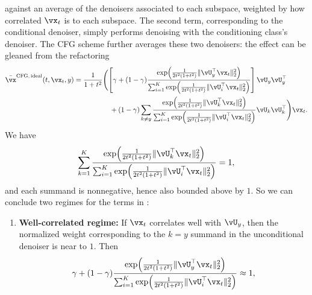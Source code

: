 \documentclass[../../book-main.tex]{subfiles}
\begin{document}
\begin{example}
  against an average of the denoisers associated to each subspace, weighted by
  how correlated $\vx_t$ is to each subspace. The second term, corresponding to
  the conditional denoiser, simply performs denoising with the conditioning
  class's denoiser. The CFG scheme further averages these two denoisers:
  the effect can be gleaned from the refactoring
  \begin{equation}\label{eq:cfg-denoiser-mog-low-rank-2}
    \begin{split}
      \bar{\vx}^{\mathrm{CFG,\,ideal}}(t, \vx_t, y)
      =
      \frac{1}{1 + t^{2}}
      &\Biggl(
      \left[\gamma + (1 - \gamma) 
      \frac{\exp\rp{\frac{1}{2t^{2}(1
      + t^{2})}\norm{\vU_{y}^{\top}\vx_t}_{2}^{2}}}{\sum_{i
      = 1}^{K}\exp\rp{\frac{1}{2t^{2}(1
      + t^{2})}\norm{\vU_{i}^{\top}\vx_t}_{2}^{2}}}
      \right]
      \vU_{y}\vU_{y}^{\top}
      \\
      &\quad+
      (1 - \gamma) 
      \sum_{k \neq y}\frac{\exp\rp{\frac{1}{2t^{2}(1
      + t^{2})}\norm{\vU_{k}^{\top}\vx_t}_{2}^{2}}}{\sum_{i
      = 1}^{K}\exp\rp{\frac{1}{2t^{2}(1
      + t^{2})}\norm{\vU_{i}^{\top}\vx_t}_{2}^{2}}}\vU_{k}\vU_{k}^{\top}
      \Biggr)
      \vx_t.
    \end{split}
  \end{equation}
  We have
  \begin{equation}
    \sum_{k=1}^K
    \frac{\exp\rp{\frac{1}{2t^{2}(1
    + t^{2})}\norm{\vU_{k}^{\top}\vx_t}_{2}^{2}}}{\sum_{i
    = 1}^{K}\exp\rp{\frac{1}{2t^{2}(1
    + t^{2})}\norm{\vU_{i}^{\top}\vx_t}_{2}^{2}}}
    = 1,
  \end{equation}
  and each summand is nonnegative, hence also bounded above by $1$.
  So we can conclude two regimes for the terms in
  : 
  \begin{enumerate}
    \item \textbf{Well-correlated regime:} If $\vx_t$ correlates well with
      $\vU_y$, then the normalized weight corresponding to the $k=y$ summand in
      the unconditional denoiser is near to $1$. 
      Then 
      \begin{equation}
        \gamma + (1 - \gamma) 
      \frac{\exp\rp{\frac{1}{2t^{2}(1
      + t^{2})}\norm{\vU_{y}^{\top}\vx_t}_{2}^{2}}}{\sum_{i
      = 1}^{K}\exp\rp{\frac{1}{2t^{2}(1
      + t^{2})}\norm{\vU_{i}^{\top}\vx_t}_{2}^{2}}}
        \approx 1,
      \end{equation}

\end{enumerate}
\end{example}
\end{document}
